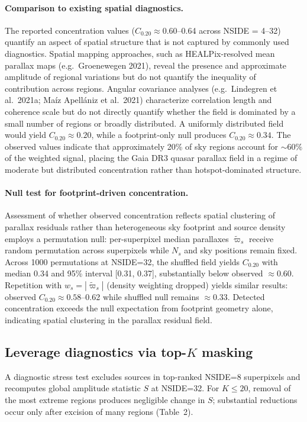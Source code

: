 \documentclass{aa}
\begin{document}
\paragraph{Comparison to existing spatial diagnostics.}
The reported concentration values ($C_{0.20} \approx 0.60$--0.64 across NSIDE = 4--32) quantify an aspect of spatial structure that is not captured by commonly used diagnostics. Spatial mapping approaches, such as HEALPix-resolved mean parallax maps (e.g.\ Groenewegen 2021), reveal the presence and approximate amplitude of regional variations but do not quantify the inequality of contribution across regions. Angular covariance analyses (e.g.\ Lindegren et al.\ 2021a; Ma\'iz Apell\'aniz et al.\ 2021) characterize correlation length and coherence scale but do not directly quantify whether the field is dominated by a small number of regions or broadly distributed. A uniformly distributed field would yield $C_{0.20} \approx 0.20$, while a footprint-only null produces $C_{0.20} \approx 0.34$. The observed values indicate that approximately 20\% of sky regions account for ${\sim}60\%$ of the weighted signal, placing the Gaia DR3 quasar parallax field in a regime of moderate but distributed concentration rather than hotspot-dominated structure.

\paragraph{Null test for footprint-driven concentration.}
Assessment of whether observed concentration reflects spatial clustering of parallax residuals rather than heterogeneous sky footprint and source density employs a permutation null: per-superpixel median parallaxes $\tilde{\varpi}_s$ receive random permutation across superpixels while $N_s$ and sky positions remain fixed. Across 1000 permutations at NSIDE=32, the shuffled field yields $C_{0.20}$ with median 0.34 and 95\% interval [0.31, 0.37], substantially below observed $\approx 0.60$. Repetition with $w_s = |\tilde{\varpi}_s|$ (density weighting dropped) yields similar results: observed $C_{0.20} \approx 0.58$--0.62 while shuffled null remains $\approx 0.33$. Detected concentration exceeds the null expectation from footprint geometry alone, indicating spatial clustering in the parallax residual field.

\subsection{Leverage diagnostics via top-\texorpdfstring{$K$}{K} masking}
A diagnostic stress test excludes sources in top-ranked NSIDE=8 superpixels and recomputes global amplitude statistic $S$ at NSIDE=32. For $K \le 20$, removal of the most extreme regions produces negligible change in $S$; substantial reductions occur only after excision of many regions (Table~2).
\end{document}
